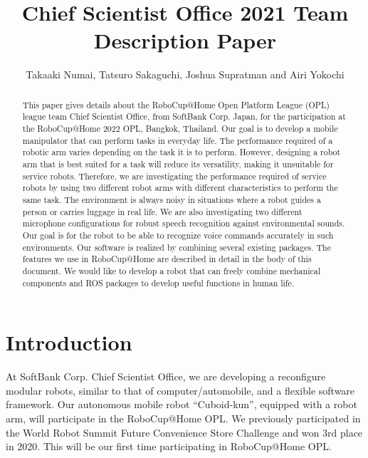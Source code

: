 \documentclass[runningheads,a4paper]{llncs}
\title{Chief Scientist Office 2021 Team Description Paper}
\author{Takaaki Numai, Tatsuro Sakaguchi, Joshua Supratman and Airi Yokochi}
\institute{Affiliation name and address, \\
\texttt{http://devoted-web-site.url}}
\begin{document}
\maketitle

%
%

\begin{abstract}
    This paper gives details about the RoboCup@Home Open Platform League (OPL) league team Chief Scientist Office, from SoftBank Corp. Japan, for the participation at the RoboCup@Home 2022 OPL, Bangkok, Thailand. Our goal is to develop a mobile manipulator that can perform tasks in everyday life. The performance required of a robotic arm varies depending on the task it is to perform. However, designing a robot arm that is best suited for a task will reduce its versatility, making it unsuitable for service robots. Therefore, we are investigating the performance required of service robots by using two different robot arms with different characteristics to perform the same task. The environment is always noisy in situations where a robot guides a person or carries luggage in real life. We are also investigating two different microphone configurations for robust speech recognition against environmental sounds. Our goal is for the robot to be able to recognize voice commands accurately in such environments. Our software is realized by combining several existing packages. The features we use in RoboCup@Home are described in detail in the body of this document. We would like to develop a robot that can freely combine mechanical components and ROS packages to develop useful functions in human life.
\end{abstract}



\section{Introduction}
At SoftBank Corp. Chief Scientist Office, we are developing a reconfigure modular robots, similar to that of computer/automobile, and a flexible software framework. Our autonomous mobile robot ``Cuboid-kun'', equipped with a robot arm, will participate in the RoboCup@Home OPL. We previously participated in the World Robot Summit Future Convenience Store Challenge and won 3rd place in 2020. This will be our first time participating in RoboCup@Home OPL.
\end{document}
